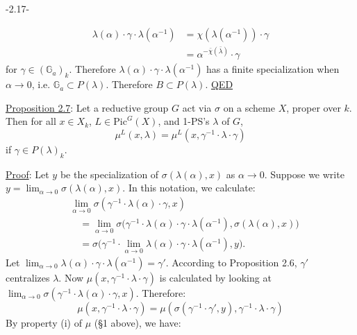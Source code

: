 \begin{center}-2.17-\end{center}
\[
\begin{aligned}
\lambda(\alpha)\cdot\gamma\cdot\lambda(\alpha^{-1})
&=\chi(\lambda(\alpha^{-1}))\cdot\gamma\\
&=\alpha^{-\bar\chi(\bar\lambda)}\cdot\gamma
\end{aligned}
\]
for $\gamma\in(\mathbb G_a)_k$. Therefore $\lambda(\alpha)\cdot\gamma\cdot\lambda(\alpha^{-1})$ has a finite specialization when $\alpha\longrightarrow0$, i.e. $\mathbb G_a\subset P(\lambda)$. Therefore $B\subset P(\lambda)$. \uline{QED}

\uline{Proposition 2.7}: Let a reductive group $G$ act via $\sigma$ on a scheme $X$, proper over $k$. Then for all $x\in X_k$, $L\in\mathrm{Pic}^G(X)$, and 1-PS's $\lambda$ of $G$,
\[
\mu^L(x,\lambda)=\mu^L(x,\gamma^{-1}\cdot\lambda\cdot\gamma)
\]
if $\gamma\in P(\lambda)_k$.

\uline{Proof}: Let $y$ be the specialization of $\sigma(\lambda(\alpha),x)$ as $\alpha\longrightarrow0$. Suppose we write $y=\lim_{\alpha\to0}\sigma(\lambda(\alpha),x)$. In this notation, we calculate:
\[
\begin{aligned}
&\lim_{\alpha\to0}\sigma(\gamma^{-1}\cdot\lambda(\alpha)\cdot\gamma,x)\\
&\quad=\lim_{\alpha\to0}\sigma\bigl(\gamma^{-1}\cdot\lambda(\alpha)\cdot\gamma\cdot\lambda(\alpha^{-1}),\sigma(\lambda(\alpha),x)\bigr)\\
&\quad=\sigma\bigl(\gamma^{-1}\cdot\lim_{\alpha\to0}\lambda(\alpha)\cdot\gamma\cdot\lambda(\alpha^{-1}),y\bigr).
\end{aligned}
\]
Let $\lim_{\alpha\to0}\lambda(\alpha)\cdot\gamma\cdot\lambda(\alpha^{-1})=\gamma'$. According to Proposition 2.6, $\gamma'$ centralizes $\lambda$. Now $\mu(x,\gamma^{-1}\cdot\lambda\cdot\gamma)$ is calculated by looking at $\lim_{\alpha\to0}\sigma(\gamma^{-1}\cdot\lambda(\alpha)\cdot\gamma,x)$. Therefore:
\[
\mu(x,\gamma^{-1}\cdot\lambda\cdot\gamma)
=\mu(\sigma(\gamma^{-1}\cdot\gamma',y),\gamma^{-1}\cdot\lambda\cdot\gamma)
\]
By property (i) of $\mu$ (\S1 above), we have:
